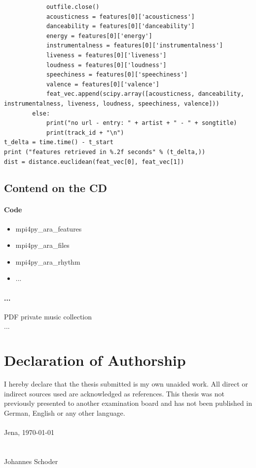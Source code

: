 \documentclass[a4paper,oneside,12pt]{report}
\begin{document}
\begin{lstlisting}
			outfile.close()    
			acousticness = features[0]['acousticness']
			danceability = features[0]['danceability']
			energy = features[0]['energy']
			instrumentalness = features[0]['instrumentalness']
			liveness = features[0]['liveness']
			loudness = features[0]['loudness']
			speechiness = features[0]['speechiness']
			valence = features[0]['valence']
			feat_vec.append(scipy.array([acousticness, danceability, instrumentalness, liveness, loudness, speechiness, valence]))	
		else: 
			print("no url - entry: " + artist + " - " + songtitle)
			print(track_id + "\n")
t_delta = time.time() - t_start
print ("features retrieved in %.2f seconds" % (t_delta,))   
dist = distance.euclidean(feat_vec[0], feat_vec[1])
\end{lstlisting}



\section{Contend on the CD}\label{DVD}

\subsubsection{Code}

\begin{itemize}
	\setlength\itemsep{-0.5em}
	\item mpi4py\_ara\_features 
	\item mpi4py\_ara\_files 
	\item mpi4py\_ara\_rhythm
	\item ... 
\end{itemize}

\subsubsection{...}

PDF private music collection\\
...



\chapter*{Declaration of Authorship}

I hereby declare that the thesis submitted is my own unaided work. All direct or indirect
sources used are acknowledged as references.
This thesis was not previously presented to another examination board and has not been
published in German, English or any other language.\\
\ \\
Jena, \today
\ \\
\ \\
\ \\
Johannes Schoder
\end{document}
